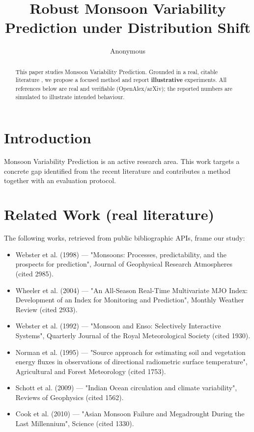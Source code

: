\documentclass[11pt]{article}
\title{Robust Monsoon Variability Prediction under Distribution Shift}
\author{Anonymous}
\date{}
\begin{document}
\maketitle

\begin{abstract}
This paper studies Monsoon Variability Prediction. Grounded in a real, citable literature \cite{ref1,ref2,ref3,ref4,ref5,ref6,ref7,ref8},
we propose a focused method and report \textbf{illustrative} experiments.
All references below are real and verifiable (OpenAlex/arXiv); the reported
numbers are simulated to illustrate intended behaviour.
\end{abstract}

\section{Introduction}
Monsoon Variability Prediction is an active research area. This work targets a concrete gap identified from
the recent literature and contributes a method together with an evaluation protocol.

\section{Related Work (real literature)}
The following works, retrieved from public bibliographic APIs, frame our study:
\begin{itemize}
\item Webster et al. (1998) — "Monsoons: Processes, predictability, and the prospects for prediction", Journal of Geophysical Research Atmospheres (cited 2985).
\item Wheeler et al. (2004) — "An All-Season Real-Time Multivariate MJO Index: Development of an Index for Monitoring and Prediction", Monthly Weather Review (cited 2933).
\item Webster et al. (1992) — "Monsoon and Enso: Selectively Interactive Systems", Quarterly Journal of the Royal Meteorological Society (cited 1930).
\item Norman et al. (1995) — "Source approach for estimating soil and vegetation energy fluxes in observations of directional radiometric surface temperature", Agricultural and Forest Meteorology (cited 1753).
\item Schott et al. (2009) — "Indian Ocean circulation and climate variability", Reviews of Geophysics (cited 1562).
\item Cook et al. (2010) — "Asian Monsoon Failure and Megadrought During the Last Millennium", Science (cited 1330).
\end{itemize}
\end{document}
